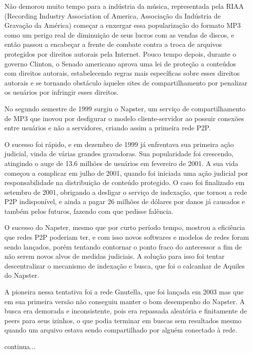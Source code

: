 Não demorou muito tempo para a indústria da música, representada pela RIAA (Recording
Industry Association of America, Associação da Indústria de Gravação da América) começar
a enxergar essa popularização do formato MP3 como um perigo real de diminuição de seus
lucros com as vendas de discos, e então passou a encabeçar a frente de combate contra a
troca de arquivos protegidos por direitos autorais pela Internet. Pouco tempo depois,
durante o governo Clinton, o Senado americano aprova uma lei de proteção a conteúdos com
direitos autorais, estabelecendo regras mais específicas sobre esses direitos autorais e
se tornando obstáculo àqueles sites de compartilhamento por penalizar os usuários por
infringir esses direitos.

No segundo semestre de 1999 surgiu o Napster, um serviço de compartilhamento de MP3 que
inovou por desfigurar o modelo cliente-servidor ao possuir conexões entre usuários e não
a servidores, criando assim a primeira rede P2P.

O sucesso foi rápido, e em dezembro de 1999 já enfrentava sua primeira ação judicial,
vinda de várias grandes gravadoras. Sua popularidade foi crescendo, atingindo o auge de
13.6 milhões de usuários em fevereiro de 2001. A sua vida começou a complicar em julho de
2001, quando foi iniciada uma ação judicial por responsabilidade na distribuição de
conteúdo protegido. O caso foi finalizado em setembro de 2001, obrigando a desligar o
serviço de indexação, que tornou a rede P2P indisponível, e ainda a pagar 26 milhões de
dólares por danos já causados e também pelos futuros, fazendo com que pedisse falência.

O sucesso do Napster, mesmo que por curto período tempo, mostrou a eficiência que redes
P2P poderiam ter, e com isso novos softwares e modelos de redes foram sendo lançados,
porém tentando contornar o ponto fraco do antecessor a fim de não serem novos alvos de
medidas judiciais. A solução para isso foi tentar descentralizar o mecanismo de indexação
e busca, que foi o calcanhar de Aquiles do Napster.

A pioneira nessa tentativa foi a rede Gnutella, que foi lançada em 2003 mas que em sua
primeira versão não conseguiu manter o bom desempenho do Napster. A busca era demorada e
inconsistente, pois era repassada aleatória e finitamente de peers para seus izinhos, o
que podia terminar em buscas sem resultados mesmo quando um arquivo estava sendo
compartilhado por alguém conectado à rede.

continua...


